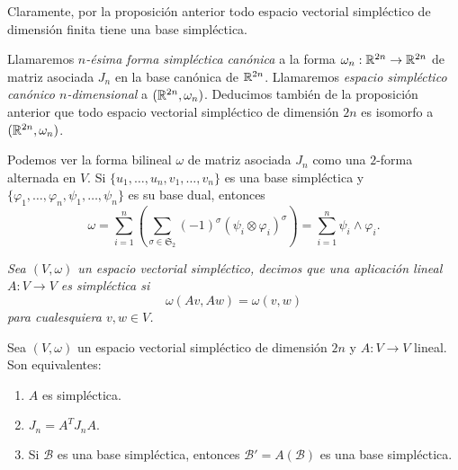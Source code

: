 \begin{obs}
  Claramente, por la proposición anterior todo espacio vectorial simpléctico de dimensión finita tiene una base simpléctica.
\end{obs}
\begin{obs}
  Llamaremos \emph{$n$-ésima forma simpléctica canónica} a la forma $\omega_n:\mathbb{R}^{2n} \rightarrow \mathbb{R}^{2n}$ de matriz asociada $J_n$ en la base canónica de $\mathbb{R}^{2n}$. Llamaremos \emph{espacio simpléctico canónico $n$-dimensional} a $(\mathbb{R}^{2n},\omega_n)$. Deducimos también de la proposición anterior que todo espacio vectorial simpléctico de dimensión $2n$ es isomorfo a $(\mathbb{R}^{2n},\omega_n)$.
\end{obs}
\begin{obs}
  Podemos ver la forma bilineal $\omega$ de matriz asociada $J_n$ como una $2$-forma alternada en $V$. Si $\{u_1,\dots,u_n,v_1,\dots,v_n\}$ es una base simpléctica y $\{\varphi_1,\dots, \varphi_n, \psi_1,\dots, \psi_n \}$ es su base dual, entonces
  \[
    \omega = \sum_{i=1}^n \left(\sum_{\sigma \in \mathfrak{S}_2} (-1)^{\sigma} (\psi_i \otimes \varphi_i)^{\sigma}\right)= \sum_{i=1}^n \psi_i \wedge \varphi_i.
  \]
\end{obs}
\begin{defn}
  \em
  Sea $(V,\omega)$ un espacio vectorial simpléctico, decimos que una aplicación lineal $A:V \rightarrow V$ es \emph{simpléctica} si
  \[
    \omega(Av,Aw) = \omega(v,w)
  \]
  para cualesquiera $v,w \in V$.
\end{defn}
\begin{prop}
  Sea $(V,\omega)$ un espacio vectorial simpléctico de dimensión $2n$ y $A: V \rightarrow V$ lineal. Son equivalentes:
  \begin{enumerate}
    \item $A$ es simpléctica.
    \item $J_n=A^T J_n A.$
    
    \item Si $\mathcal{B}$ es una base simpléctica, entonces $\mathcal{B}'=A(\mathcal{B})$ es una base simpléctica.
  \end{enumerate}
\end{prop}
